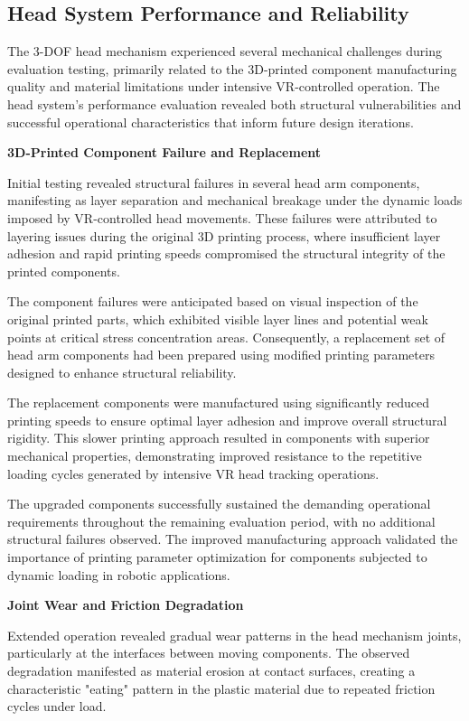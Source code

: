 \subsection{Head System Performance and Reliability}

The 3-DOF head mechanism experienced several mechanical challenges during evaluation testing, primarily related to the 3D-printed component manufacturing quality and material limitations under intensive VR-controlled operation. The head system's performance evaluation revealed both structural vulnerabilities and successful operational characteristics that inform future design iterations.

\textbf{3D-Printed Component Failure and Replacement}

Initial testing revealed structural failures in several head arm components, manifesting as layer separation and mechanical breakage under the dynamic loads imposed by VR-controlled head movements. These failures were attributed to layering issues during the original 3D printing process, where insufficient layer adhesion and rapid printing speeds compromised the structural integrity of the printed components.

The component failures were anticipated based on visual inspection of the original printed parts, which exhibited visible layer lines and potential weak points at critical stress concentration areas. Consequently, a replacement set of head arm components had been prepared using modified printing parameters designed to enhance structural reliability.

The replacement components were manufactured using significantly reduced printing speeds to ensure optimal layer adhesion and improve overall structural rigidity. This slower printing approach resulted in components with superior mechanical properties, demonstrating improved resistance to the repetitive loading cycles generated by intensive VR head tracking operations.

The upgraded components successfully sustained the demanding operational requirements throughout the remaining evaluation period, with no additional structural failures observed. The improved manufacturing approach validated the importance of printing parameter optimization for components subjected to dynamic loading in robotic applications.

\textbf{Joint Wear and Friction Degradation}

Extended operation revealed gradual wear patterns in the head mechanism joints, particularly at the interfaces between moving components. The observed degradation manifested as material erosion at contact surfaces, creating a characteristic "eating" pattern in the plastic material due to repeated friction cycles under load.

